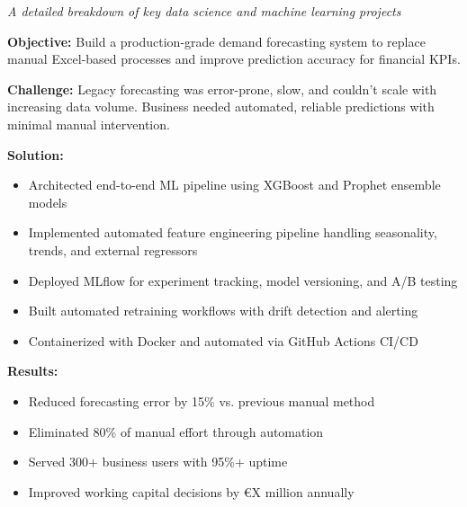 \documentclass[11pt, a4paper]{awesome-cv}
\begin{document}
\makecvheader

\begin{center}
\textit{A detailed breakdown of key data science and machine learning projects}
\end{center}

\vspace{0.5em}


\begin{cvparagraph}
\textbf{Objective:} Build a production-grade demand forecasting system to replace manual Excel-based processes and improve prediction accuracy for financial KPIs.
\end{cvparagraph}

\begin{cvparagraph}
\textbf{Challenge:} Legacy forecasting was error-prone, slow, and couldn't scale with increasing data volume. Business needed automated, reliable predictions with minimal manual intervention.
\end{cvparagraph}

\begin{cvparagraph}
\textbf{Solution:}
\begin{itemize}
    \item Architected end-to-end ML pipeline using XGBoost and Prophet ensemble models
    \item Implemented automated feature engineering pipeline handling seasonality, trends, and external regressors
    \item Deployed MLflow for experiment tracking, model versioning, and A/B testing
    \item Built automated retraining workflows with drift detection and alerting
    \item Containerized with Docker and automated via GitHub Actions CI/CD
\end{itemize}
\end{cvparagraph}

\begin{cvparagraph}
\textbf{Results:}
\begin{itemize}
    \item Reduced forecasting error by 15\% vs. previous manual method
    \item Eliminated 80\% of manual effort through automation
    \item Served 300+ business users with 95\%+ uptime
    \item Improved working capital decisions by €X million annually
\end{itemize}
\end{cvparagraph}
\end{document}
